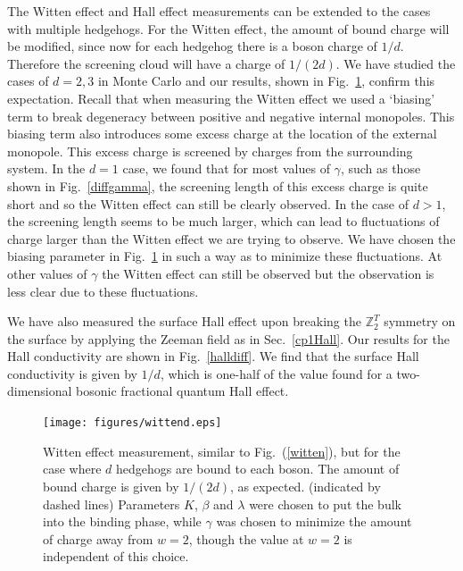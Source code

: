 \documentclass[prb,twocolumn]{revtex4-1}
\newcommand{\scripty}[1]{w}
\def\ztwot{\mathbb{Z}_2^T}
\begin{document}
The Witten effect and Hall effect measurements can be extended to the cases with multiple hedgehogs. For the Witten effect, the amount of bound charge will be modified, since now for each hedgehog there is a boson charge of $1/d$. Therefore the screening cloud will have a charge of $1/(2d)$. We have studied the cases of $d=2, 3$ in Monte Carlo and our results, shown in Fig.~\ref{wittend}, confirm this expectation. Recall that when measuring the Witten effect we used a `biasing' term to break degeneracy between positive and negative internal monopoles. This biasing term also introduces some excess charge at the location of the external monopole. This excess charge is screened by charges from the surrounding system. In the $d=1$ case, we found that for most values of $\gamma$, such as those shown in Fig.~\ref{diffgamma}, the screening length of this excess charge is quite short and so the Witten effect can still be clearly observed. In the case of $d>1$, the screening length seems to be much larger, which can lead to fluctuations of charge larger than the Witten effect we are trying to observe. We have chosen the biasing parameter in Fig.~\ref{wittend} in such a way as to minimize these fluctuations. At other values of $\gamma$ the Witten effect can still be observed but the observation is less clear due to these fluctuations.

We have also measured the surface Hall effect upon breaking the $\ztwot$ symmetry on the surface by applying the Zeeman field as in Sec.~\ref{cp1Hall}.
Our results for the Hall conductivity are shown in Fig.~\ref{halldiff}. We find that the surface Hall conductivity is given by $1/d$, which is one-half of the value found for a two-dimensional bosonic fractional quantum Hall effect.\cite{FQHE}

\begin{figure}
\texttt{[image: figures/wittend.eps]}
\caption{Witten effect measurement, similar to Fig.~(\ref{witten}), but for the case where $d$ hedgehogs are bound to each boson. The amount of bound charge is given by $1/(2d)$, as expected. (indicated by dashed lines) Parameters $K$, $\beta$ and $\lambda$ were chosen to put the bulk into the binding phase, while $\gamma$ was chosen to minimize the amount of charge away from $\scripty{r}=2$, though the value at $\scripty{r}=2$ is independent of this choice.
}
\label{wittend}
\end{figure}
\end{document}
